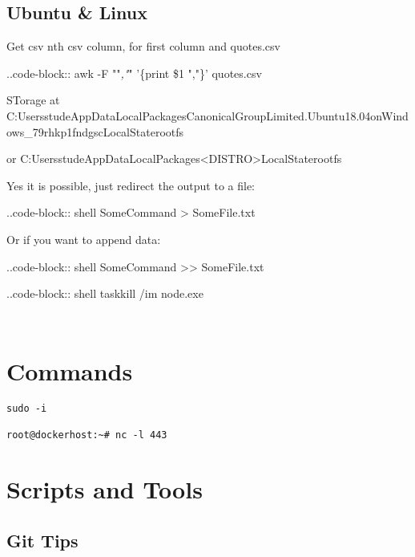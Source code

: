 \subsection{Ubuntu \& Linux}\label{ubuntu-linux}

Get csv nth csv column, for first column and quotes.csv

..code-block:: awk -F ""\emph{,"}" '\{print \$1 ","\}' quotes.csv

STorage at
C:UsersstudeAppDataLocalPackagesCanonicalGroupLimited.Ubuntu18.04onWindows\_79rhkp1fndgscLocalStaterootfs

or
C:UsersstudeAppDataLocalPackages\textless DISTRO\textgreater LocalStaterootfs

Yes it is possible, just redirect the output to a file:

..code-block:: shell SomeCommand \textgreater{} SomeFile.txt

Or if you want to append data:

..code-block:: shell SomeCommand \textgreater\textgreater{} SomeFile.txt

..code-block:: shell taskkill /im node.exe

\begin{verbatim}
\end{verbatim}

\begin{verbatim}
\end{verbatim}


\section{Commands}\label{commands}

\begin{Shaded}
\end{Shaded}

\begin{verbatim}
sudo -i

root@dockerhost:~# nc -l 443
\end{verbatim}


\section{Scripts and Tools}\label{scripts-and-tools}


\subsection{Git Tips}\label{git-tips}

